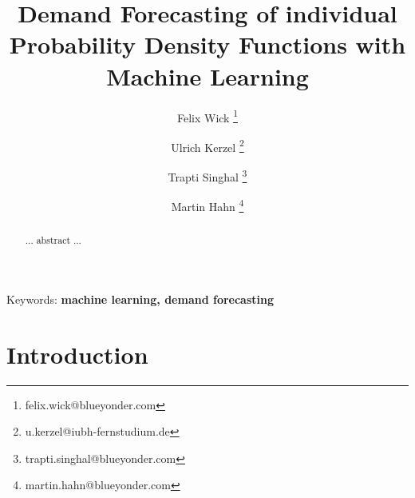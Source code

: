 \documentclass[BCOR=1mm, DIV=calc,10pt,
twoside=true,
twocolumn,
headings=normal]{scrartcl}
\begin{document}
\title{Demand Forecasting of individual Probability Density Functions with Machine Learning}

\author[1]{Felix Wick \thanks{felix.wick@blueyonder.com}}
\author[2]{Ulrich Kerzel \thanks{u.kerzel@iubh-fernstudium.de}}
\author[1]{Trapti Singhal \thanks{trapti.singhal@blueyonder.com}}
\author[1]{Martin Hahn \thanks{martin.hahn@blueyonder.com}}


\date{}

\maketitle

\begin{abstract}
... abstract ...
\end{abstract}

{Keywords: \textbf{machine learning, demand forecasting}}


\section{Introduction}
\end{document}
